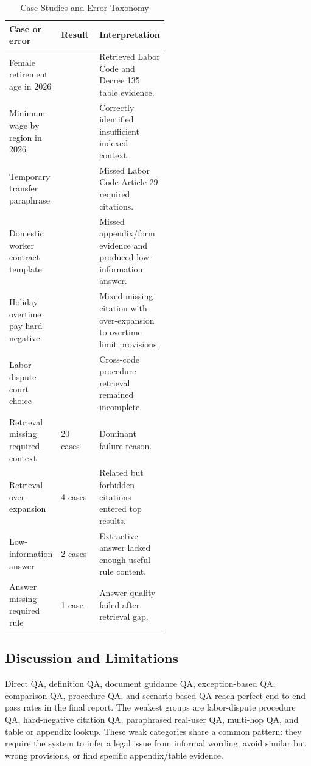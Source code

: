 \begin{table}[H]
  \centering
  \caption{Case Studies and Error Taxonomy}
  \label{tab:error-taxonomy-final}
  \small
  \begin{tabularx}{\linewidth}{@{}L{0.28\linewidth}L{0.24\linewidth}Y@{}}
    \toprule
    Case or error & Result & Interpretation \\
    \midrule
    Female retirement age in 2026 &  & Retrieved Labor Code and Decree 135 table evidence. \\
    Minimum wage by region in 2026 &  & Correctly identified insufficient indexed context. \\
    Temporary transfer paraphrase &  & Missed Labor Code Article 29 required citations. \\
    Domestic worker contract template &  & Missed appendix/form evidence and produced low-information answer. \\
    Holiday overtime pay hard negative &  & Mixed missing citation with over-expansion to overtime limit provisions. \\
    Labor-dispute court choice &  & Cross-code procedure retrieval remained incomplete. \\
    \midrule
    Retrieval missing required context & 20 cases & Dominant failure reason. \\
    Retrieval over-expansion & 4 cases & Related but forbidden citations entered top results. \\
    Low-information answer & 2 cases & Extractive answer lacked enough useful rule content. \\
    Answer missing required rule & 1 case & Answer quality failed after retrieval gap. \\
    \bottomrule
  \end{tabularx}
\end{table}

\subsection{Discussion and Limitations}
Direct QA, definition QA, document guidance QA, exception-based QA, comparison QA, procedure QA, and scenario-based QA reach perfect end-to-end pass rates in the final report. The weakest groups are labor-dispute procedure QA, hard-negative citation QA, paraphrased real-user QA, multi-hop QA, and table or appendix lookup. These weak categories share a common pattern: they require the system to infer a legal issue from informal wording, avoid similar but wrong provisions, or find specific appendix/table evidence.

